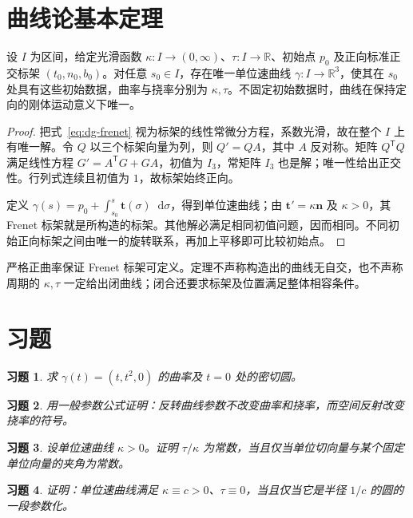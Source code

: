 \documentclass[UTF8,12pt,a4paper,fontset=fandol]{ctexbook}
\newcommand{\R}{\mathbb R}
\newcommand{\dd}{\mathop{}\!\mathrm d}
\newtheorem{exercise}{习题}[chapter]
\begin{document}
\section{曲线论基本定理}
\begin{theorem}[曲率与挠率决定曲线]
设 $I$ 为区间，给定光滑函数 $\kappa:I\to(0,\infty)$、$\tau:I\to\R$、初始点 $p_0$ 及正向标准正交标架 $(t_0,n_0,b_0)$。对任意 $s_0\in I$，存在唯一单位速曲线 $\gamma:I\to\R^3$，使其在 $s_0$ 处具有这些初始数据，曲率与挠率分别为 $\kappa,\tau$。不固定初始数据时，曲线在保持定向的刚体运动意义下唯一。
\label{thm:dg-curve-fundamental}
\end{theorem}
\begin{proof}
把式~\eqref{eq:dg-frenet} 视为标架的线性常微分方程，系数光滑，故在整个 $I$ 上有唯一解。令 $Q$ 以三个标架向量为列，则 $Q'=QA$，其中 $A$ 反对称。矩阵 $Q^{\mathsf T}Q$ 满足线性方程 $G'=A^{\mathsf T}G+GA$，初值为 $I_3$，常矩阵 $I_3$ 也是解；唯一性给出正交性。行列式连续且初值为 $1$，故标架始终正向。

定义 $\gamma(s)=p_0+\int_{s_0}^s\mathbf t(\sigma)\dd\sigma$，得到单位速曲线；由 $\mathbf t'=\kappa\mathbf n$ 及 $\kappa>0$，其 Frenet 标架就是所构造的标架。其他解必满足相同初值问题，因而相同。不同初始正向标架之间由唯一的旋转联系，再加上平移即可比较初始点。
\end{proof}
严格正曲率保证 Frenet 标架可定义。定理不声称构造出的曲线无自交，也不声称周期的 $\kappa,\tau$ 一定给出闭曲线；闭合还要求标架及位置满足整体相容条件。

\section{习题}
\begin{exercise}\label{ex:dg-curves-parabola}
求 $\gamma(t)=(t,t^2,0)$ 的曲率及 $t=0$ 处的密切圆。
\end{exercise}
\begin{exercise}\label{ex:dg-curves-reverse}
用一般参数公式证明：反转曲线参数不改变曲率和挠率，而空间反射改变挠率的符号。
\end{exercise}
\begin{exercise}\label{ex:dg-curves-lancret}
设单位速曲线 $\kappa>0$。证明 $\tau/\kappa$ 为常数，当且仅当单位切向量与某个固定单位向量的夹角为常数。
\end{exercise}
\begin{exercise}\label{ex:dg-curves-circle}
证明：单位速曲线满足 $\kappa\equiv c>0$、$\tau\equiv0$，当且仅当它是半径 $1/c$ 的圆的一段参数化。
\end{exercise}
\end{document}
